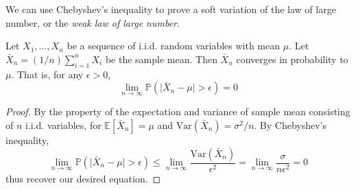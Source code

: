 We can use Chebyshev's inequality to prove a soft variation of the law of large number, or the \textit{weak law of large number}. 
\begin{theorem}
    Let $X_{1},\dots,X_{n}$ be a sequence of i.i.d. random variables with mean $\mu$. Let $\bar{X}_{n}=(1/n)\sum_{i=1}^{n}X_{i}$ be the sample mean. Then $\bar{X}_{n}$ converges in probability to $\mu$. That is, for any $\epsilon>0$, 
    \begin{equation}
        \lim_{n\to\infty}\mathbb{P}\left(\lvert \bar{X}_{n}-\mu\rvert > \epsilon\right)=0
    \end{equation}
\end{theorem}
\begin{proof}
    By the property of the expectation and variance of sample mean consisting of $n$ i.i.d. variables, for $\mathbb{E}[\bar{X}_{n}]=\mu$ and $\mathrm{Var}(\bar{X}_{n})=\sigma^{2}/n$. By Chebyshev's inequality, 
    \begin{equation}
        \lim_{n\to\infty} \mathbb{P}\left(\lvert \bar{X}_{n}-\mu\rvert > \epsilon\right) \leq \lim_{n\to \infty} \frac{\mathrm{Var}(\bar{X}_{n})}{\epsilon^{2}} = \lim_{n\to\infty} \frac{\sigma}{n\epsilon^{2}} = 0
    \end{equation}
    thus recover our desired equation. 
\end{proof}
